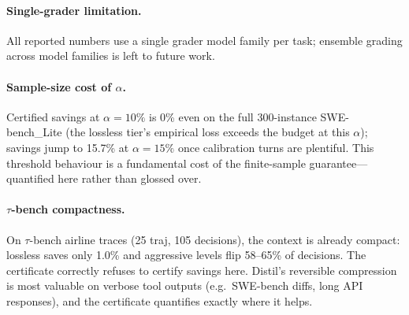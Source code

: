 \documentclass[11pt]{article}
\begin{document}
\paragraph{Single-grader limitation.} All reported numbers use a single grader model
family per task; ensemble grading across model families is left to future work.

\paragraph{Sample-size cost of $\alpha$.} Certified savings at $\alpha=10\%$ is 0\%
even on the full 300-instance SWE-bench\_Lite (the lossless tier's empirical loss
exceeds the budget at this $\alpha$); savings jump to 15.7\% at $\alpha=15\%$ once
calibration turns are plentiful. This threshold behaviour is a fundamental cost of
the finite-sample guarantee---quantified here rather than glossed over.

\paragraph{$\tau$-bench compactness.} On $\tau$-bench airline traces (25 traj, 105
decisions), the context is already compact: lossless saves only 1.0\% and aggressive
levels flip 58--65\% of decisions. The certificate correctly refuses to certify
savings here. Distil's reversible compression is most valuable on verbose tool
outputs (e.g.\ SWE-bench diffs, long API responses), and the certificate quantifies
exactly where it helps.
\end{document}
